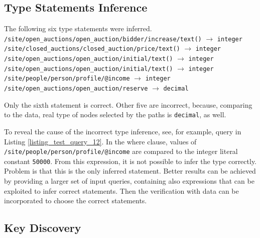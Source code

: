 \subsection{Type Statements Inference}
The following six type statements were inferred.\\
\texttt{/site/open\_auctions/open\_auction/bidder/increase/text()} $\rightarrow$ \texttt{integer}\\
\texttt{/site/closed\_auctions/closed\_auction/price/text()} $\rightarrow$ \texttt{integer}\\
\texttt{/site/open\_auctions/open\_auction/initial/text()} $\rightarrow$ \texttt{integer}\\
\texttt{/site/open\_auctions/open\_auction/initial/text()} $\rightarrow$ \texttt{integer}\\
\texttt{/site/people/person/profile/@income} $\rightarrow$ \texttt{integer}\\
\texttt{/site/open\_auctions/open\_auction/reserve} $\rightarrow$ \texttt{decimal}

Only the sixth statement is correct. Other five are incorrect, because, comparing to the data, real type of nodes selected by the paths is \texttt{decimal}, as well.

To reveal the cause of the incorrect type inference, see, for example, query in Listing \ref{listing_test_query_12}. In the where clause, values of \texttt{/site/people/person/profile/@income} are compared to the integer literal constant \texttt{50000}. From this expression, it is not possible to infer the type correctly. Problem is that this is the only inferred statement. Better results can be achieved by providing a larger set of input queries, containing also expressions that can be exploited to infer correct statements. Then the verification with data can be incorporated to choose the correct statements.




\subsection{Key Discovery}